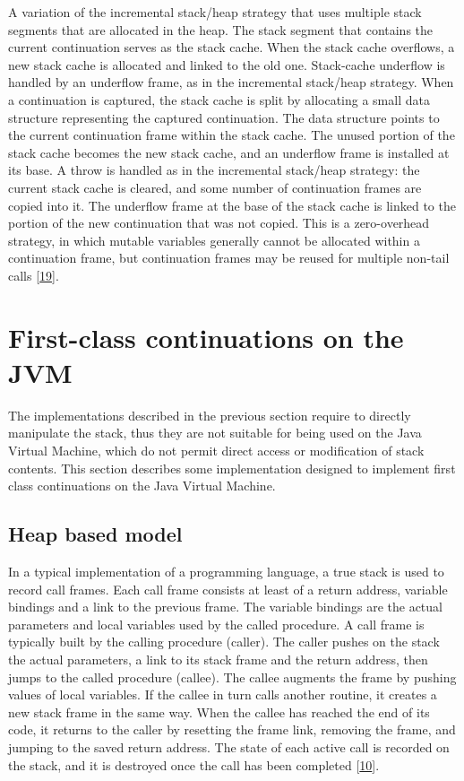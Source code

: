\documentclass[12pt,a4paper,oneside,openright]{book}
\begin{document}
A variation of the incremental stack/heap strategy that uses multiple
stack segments that are allocated in the heap. The stack segment that
contains the current continuation serves as the stack cache. When the
stack cache overflows, a new stack cache is allocated and linked to the
old one. Stack-cache underflow is handled by an underflow frame, as in
the incremental stack/heap strategy. When a continuation is captured,
the stack cache is split by allocating a small data structure
representing the captured continuation. The data structure points to the
current continuation frame within the stack cache. The unused portion of
the stack cache becomes the new stack cache, and an underflow frame is
installed at its base. A throw is handled as in the incremental
stack/heap strategy: the current stack cache is cleared, and some number
of continuation frames are copied into it. The underflow frame at the
base of the stack cache is linked to the portion of the new continuation
that was not copied. This is a zero-overhead strategy, in which mutable
variables generally cannot be allocated within a continuation frame, but
continuation frames may be reused for multiple non-tail calls
{[}\hyperref[ref-Clinger1999]{19}{]}.

\section{First-class continuations on the
JVM}\label{first-class-continuations-on-the-jvm}

The implementations described in the previous section require to
directly manipulate the stack, thus they are not suitable for being used
on the Java Virtual Machine, which do not permit direct access or
modification of stack contents. This section describes some
implementation designed to implement first class continuations on the
Java Virtual Machine.

\subsection{Heap based model}\label{heap-based-model}

In a typical implementation of a programming language, a true stack is
used to record call frames. Each call frame consists at least of a
return address, variable bindings and a link to the previous frame. The
variable bindings are the actual parameters and local variables used by
the called procedure. A call frame is typically built by the calling
procedure (caller). The caller pushes on the stack the actual
parameters, a link to its stack frame and the return address, then jumps
to the called procedure (callee). The callee augments the frame by
pushing values of local variables. If the callee in turn calls another
routine, it creates a new stack frame in the same way. When the callee
has reached the end of its code, it returns to the caller by resetting
the frame link, removing the frame, and jumping to the saved return
address. The state of each active call is recorded on the stack, and it
is destroyed once the call has been completed
{[}\hyperref[ref-dybvig1987three]{10}{]}.
\end{document}
